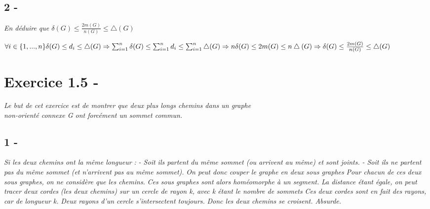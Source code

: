 \documentclass{article}
\begin{document}
    \subsection*{2 -}
            \textit{En déduire que $\delta(G) \leq \frac{2m(G)}{n(G)} \leq \bigtriangleup(G)$}\\
            \begin{center}
            $
            \forall i \in \{1,...,n\} \delta(G) \leq d_{i} \leq \bigtriangleup(G)
            \linebreak
            \Rightarrow \sum_{i=1}^{n} \delta(G) \leq \sum_{i=1}^{n} d_{i} \leq \sum_{i=1}^{n} \bigtriangleup(G)
            \linebreak
            \Rightarrow n \delta(G) \leq 2m(G) \leq n\bigtriangleup(G)
            \linebreak
            \Rightarrow  \delta(G) \leq \frac{2m(G)}{n(G)} \leq \bigtriangleup(G)
            $
            \end{center}
\section*{Exercice 1.5 -}
\textit{Le but de cet exercice est de montrer que deux plus longs chemins dans un graphe\\ non-orienté connexe G ont forcément un sommet commun.}
    \subsection*{1 -}
            \textit{Si les deux chemins ont la même longueur :}
            \linebreak
            \textit{- Soit ils partent du même sommet (ou arrivent au même) et sont joints.}
            \linebreak
            \textit{- Soit ils ne partent pas du même sommet (et n'arrivent pas au même sommet).}
            \linebreak
            \textit{On peut donc couper le graphe en deux sous graphes}
            \linebreak
            \textit{Pour chacun de ces deux sous graphes, on ne considère que les chemins.}
            \linebreak
            \textit{Ces sous graphes sont alors homéomorphe à un segment.}
            \linebreak
            \textit{La distance étant égale, on peut tracer deux cordes}
            \linebreak
            \textit{(les deux chemins) sur un cercle de rayon k, avec k étant le nombre de sommets}
            \linebreak
            \textit{Ces deux cordes sont en fait des rayons, car de longueur k.}
            \linebreak
            \textit{Deux rayons d'un cercle s'intersectent toujours.}
            \linebreak
            \textit{Donc les deux chemins se croisent. Absurde.}
\end{document}
